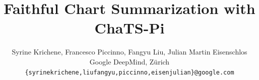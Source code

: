 \usepackage{style/ACL2023}

\usepackage{times}
\usepackage{latexsym}

\usepackage[T1]{fontenc}

\usepackage[utf8]{inputenc}

\usepackage{microtype}

\usepackage{inconsolata}



\title{Faithful Chart Summarization with ChaTS-Pi}


\author{
Syrine Krichene,
Francesco Piccinno,
Fangyu Liu,
Julian Martin Eisenschlos\\
Google DeepMind, Z{\"u}rich \\
\texttt{\{syrinekrichene,liufangyu,piccinno,eisenjulian\}@google.com}
}

\newcommand{\latexfile}[1]{}
\usepackage{amsthm}
\usepackage{framed}
\usepackage{mdwlist}
\usepackage{colortbl}
\usepackage{xcolor}
\usepackage{nicefrac}
\usepackage{booktabs}
\usepackage{amsfonts}
\usepackage[T1]{fontenc}
\usepackage{bold-extra}
\usepackage{amsmath}
\usepackage{amssymb}
\usepackage{bm}
\usepackage{graphicx}
\usepackage{mathtools}
\usepackage{multirow}
\usepackage{multicol}
\usepackage[normalem]{ulem}
\usepackage{lipsum}
\usepackage{float}
\usepackage{ifthen}
\usepackage[ruled,vlined]{algorithm2e}
\usepackage{subcaption}
\usepackage{tabularx}
\usepackage[utf8]{inputenc}
\usepackage[english]{babel}
\usepackage{amsfonts} 
\usepackage{cleveref}
\usepackage{bbm}
\usepackage{listings}

\newtheorem{theorem}{Theorem}[section]
\newtheorem{corollary}{Corollary}[theorem]
\newtheorem{lemma}[theorem]{Lemma}
\newtheorem*{remark}{Remark}

\usepackage{latexsym,comment}
\usepackage{tikz}
\usepackage{xspace}
\usepackage{xr}
\usetikzlibrary{shapes,arrows}

\usepackage{enumitem}

\newcommand{\breakalign}{\right. \nonumber \\ & \left. \hspace{2cm}}

